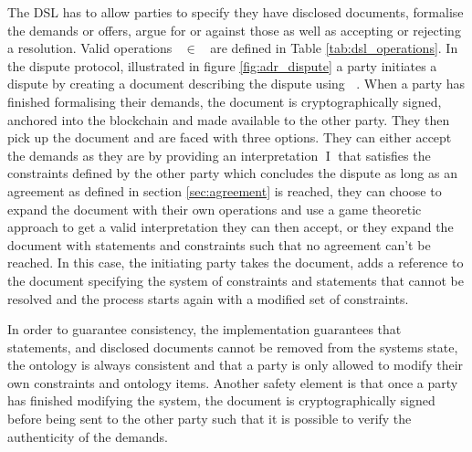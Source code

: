 \documentclass[12pt,msc,a4paper,oneside]{ucl_thesis}
\DeclareMathOperator{\Metalang}{\mathcal{L}_m}
\DeclareMathOperator{\metaop}{\mathcal{o}_m}
\DeclareMathOperator{\Interpretation}{I}
\begin{document}
The DSL has to allow parties to specify they have disclosed documents, formalise the demands or offers, argue for or against those as well as accepting or rejecting a resolution. Valid operations $\metaop \in \Metalang$ are defined in Table \ref{tab:dsl_operations}. In the dispute protocol, illustrated in figure \ref{fig:adr_dispute} a party initiates a dispute by creating a document describing the dispute using $\Metalang$. When a party has finished formalising their demands, the document is cryptographically signed, anchored into the blockchain and made available to the other party. They then pick up the document and are faced with three options. They can either accept the demands as they are by providing an interpretation $\Interpretation$ that satisfies the constraints defined by the other party which concludes the dispute as long as an agreement as defined in section \ref{sec:agreement} is reached, they can choose to expand the document with their own operations and use a game theoretic approach to get a valid interpretation they can then accept, or they expand the document with statements and constraints such that no agreement can't be reached. In this case, the initiating party takes the document, adds a reference to the document specifying the system of constraints and statements that cannot be resolved and the process starts again with a modified set of constraints.

In order to guarantee consistency, the implementation guarantees that statements, and disclosed documents cannot be removed from the systems state, the ontology is always consistent and that a party is only allowed to modify their own constraints and ontology items. Another safety element is that once a party has finished modifying the system, the document is cryptographically signed before being sent to the other party such that it is possible to verify the authenticity of the demands.






\end{document}
